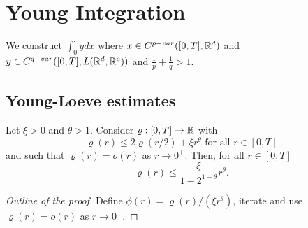 \section{Young Integration}

We construct \( \int_0^\cdot y dx \) where \(x \in C^{p-var}([0,T],\mathbb{R}^d) \) and \( y \in C^{q-var}([0,T],L(\mathbb{R}^d,\mathbb{R}^e)) \) and $\frac{1}{p} + \frac{1}{q} > 1.$

\subsection{Young-Loeve estimates}

\begin{lemma}\label{lem:prepYoungLoeve1}
    Let \( \xi > 0 \) and \( \theta > 1 \). Consider \( \varrho: [0,T] \rightarrow \mathbb{R} \) with
    \begin{equation}
        \varrho(r) \le 2 \varrho(r/2) + \xi r^\theta \text{ for all } r \in [0,T]
    \end{equation}
    and such that \( \varrho(r) = o(r) \) as \( r \rightarrow 0^+ \).
    Then, for all \( r \in [0,T] \)
    \begin{equation}
        \varrho(r) \le \frac{\xi}{1 - 2^{1-\theta}} r^\theta.
    \end{equation}
\end{lemma}
\begin{proof}[Outline of the proof]
    Define \( \phi(r) = \varrho(r) / (\xi r^\theta) \), iterate and use \( \varrho(r) = o(r) \) as \( r \rightarrow 0^+ \).
\end{proof}

